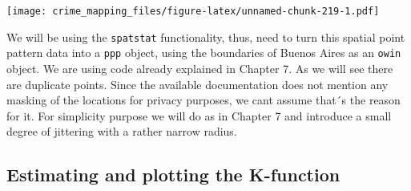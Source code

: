 \documentclass[
  krantz2]{krantz}
\makeatletter
\newenvironment{Shaded}{\begin{snugshade}}{\end{snugshade}}
\newcommand{\AttributeTok}[1]{\textcolor[rgb]{0.61,0.61,0.61}{#1}}
\newcommand{\ConstantTok}[1]{\textcolor[rgb]{0,0,0}{#1}}
\newcommand{\DecValTok}[1]{\textcolor[rgb]{0.06,0.06,0.06}{#1}}
\newcommand{\FunctionTok}[1]{\textcolor[rgb]{0,0,0}{#1}}
\newcommand{\NormalTok}[1]{#1}
\newcommand{\OtherTok}[1]{\textcolor[rgb]{0.37,0.37,0.37}{#1}}
\newcommand{\SpecialCharTok}[1]{\textcolor[rgb]{0,0,0}{#1}}
\newcommand{\StringTok}[1]{\textcolor[rgb]{0.5,0.5,0.5}{#1}}
\newenvironment{kframe}{%
\medskip{}
\setlength{\fboxsep}{.8em}
 \def\at@end@of@kframe{}%
 \ifinner\ifhmode%
  \def\at@end@of@kframe{\end{minipage}}%
  \begin{minipage}{\columnwidth}%
 \fi\fi%
 \def\FrameCommand##1{\hskip\@totalleftmargin \hskip-\fboxsep
 \colorbox{shadecolor}{##1}\hskip-\fboxsep
     \hskip-\linewidth \hskip-\@totalleftmargin \hskip\columnwidth}%
 \MakeFramed {\advance\hsize-\width
   \@totalleftmargin\z@ \linewidth\hsize
   \@setminipage}}%
 {\par\unskip\endMakeFramed%
 \at@end@of@kframe}
\renewenvironment{Shaded}{\begin{kframe}}{\end{kframe}}
\makeatother
\begin{document}
\texttt{[image: crime\_mapping\_files/figure-latex/unnamed-chunk-219-1.pdf]}

We will be using the \texttt{spatstat} functionality, thus, need to turn this spatial point pattern data into a \texttt{ppp} object, using the boundaries of Buenos Aires as an \texttt{owin} object. We are using code already explained in Chapter 7. As we will see there are duplicate points. Since the available documentation does not mention any masking of the locations for privacy purposes, we cant assume that´s the reason for it. For simplicity purpose we will do as in Chapter 7 and introduce a small degree of jittering with a rather narrow radius.

\begin{Shaded}
\end{Shaded}

\hypertarget{estimating-and-plotting-the-k-function}{%
\subsection{Estimating and plotting the K-function}\label{estimating-and-plotting-the-k-function}}
\end{document}
